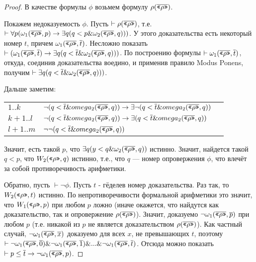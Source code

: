 \begin{proof}
В качестве формулы $\phi$ возьмем формулу $\rho(\overline{\texttt{<<}\rho\texttt{>>}})$.

Покажем недоказуемость $\phi$. Пусть $\vdash \rho(\overline{\texttt{<<}\rho\texttt{>>}})$, т.е. 
$\vdash \forall p (\omega_1 (\overline{\texttt{<<}\rho\texttt{>>}},p) \rightarrow \exists q (q < p \& \omega_2 (\overline{\texttt{<<}\rho\texttt{>>}},q)))$.
У этого доказательства есть некоторый номер $t$, причем $\omega_1 (\overline{\texttt{<<}\rho\texttt{>>}},\overline{t})$.
Несложно показать $\vdash (\omega_1 (\overline{\texttt{<<}\rho\texttt{>>}},\overline{t}) \rightarrow \exists q (q < \overline{t} \& \omega_2 (\overline{\texttt{<<}\rho\texttt{>>}},q)))$.
По построению формулы $\vdash \omega_1 (\overline{\texttt{<<}\rho\texttt{>>}},\overline{t})$, откуда, соединив
доказательства воедино, и применив правило Modus Ponens, получим 
$\vdash \exists q (q < \overline{t} \& \omega_2 (\overline{\texttt{<<}\rho\texttt{>>}},q)))$.

Дальше заметим:
\begin{tabular}{lll}
$1..k$ & $\neg (q < \overline{t} \& omega_2 (\overline{\texttt{<<}\rho\texttt{>>}},q)) \rightarrow \exists \neg (q < \overline{t} \& omega_2 (\overline{\texttt{<<}\rho\texttt{>>}},q))$ &\\
$k+1..l$ & $\neg (q < \overline{t} \& omega_2 (\overline{\texttt{<<}\rho\texttt{>>}},q)) \rightarrow \exists (q < \overline{t} \& omega_2 (\overline{\texttt{<<}\rho\texttt{>>}},q))$ &\\
$l+1..m$ & $\neg\neg (q < \overline{t} \& omega_2 (\overline{\texttt{<<}\rho\texttt{>>}},q))$ & \\
\end{tabular}

Значит, есть такой $p$, что $\exists q (y < q \& \omega_2 (\overline{\texttt{<<}\rho\texttt{>>}},q))$ истинно.
Значит, найдется такой $q < p$, что $W_2 (\texttt{<<}\rho\texttt{>>},q)$ истинно, т.е., что 
$q$ --- номер опровержения $\phi$, что влечёт за собой противоречивость арифметики.

Обратно, пусть $\vdash \neg \phi$. Пусть $t$ - гёделев номер доказательства.
Раз так, то $W_2 (\texttt{<<}\rho\texttt{>>},t)$ истинно. По непротиворечивости формальной арифметики
это значит, что $W_1 (\texttt{<<}\rho\texttt{>>},p)$ при любом $p$ ложно (иначе окажется, что 
найдутся как доказательство, так и опровержение $\rho(\overline{\texttt{<<}\rho\texttt{>>}})$). 
Значит, доказуемо $\neg \omega_1 (\overline{\texttt{<<}\rho\texttt{>>}},\overline{p})$ при 
любом $p$ (т.е. никакой из $p$ не является доказательством $\rho(\overline{\texttt{<<}\rho\texttt{>>}})$). 
Как частный случай, $\neg \omega_1 (\overline{\texttt{<<}\rho\texttt{>>}},\overline{x})$ доказуемо для
всех $x$, не превышающих $t$, поэтому 
$\vdash \neg \omega_1 (\overline{\texttt{<<}\rho\texttt{>>}},\overline{0}) \& \neg \omega_1 (\overline{\texttt{<<}\rho\texttt{>>}},\overline{1}) \& ... \& \neg \omega_1 (\overline{\texttt{<<}\rho\texttt{>>}},\overline{t})$.
Отсюда можно показать $\vdash p \le \overline{t} \rightarrow \neg \omega_1 (\overline{\texttt{<<}\rho\texttt{>>}},p)$.


\end{proof}
